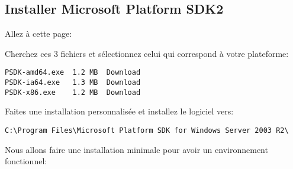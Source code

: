 \subsection{Installer Microsoft Platform SDK2}
Allez à cette page:


Cherchez ces 3 fichiers et sélectionnez celui qui correspond à votre plateforme:

\begin{verbatim}
PSDK-amd64.exe  1.2 MB  Download 
PSDK-ia64.exe   1.3 MB  Download 
PSDK-x86.exe    1.2 MB  Download
\end{verbatim}

Faites une installation personnalisée et installez le logiciel vers:

\begin{verbatim}
C:\Program Files\Microsoft Platform SDK for Windows Server 2003 R2\
\end{verbatim}

Nous allons faire une installation minimale pour avoir un environnement fonctionnel:

